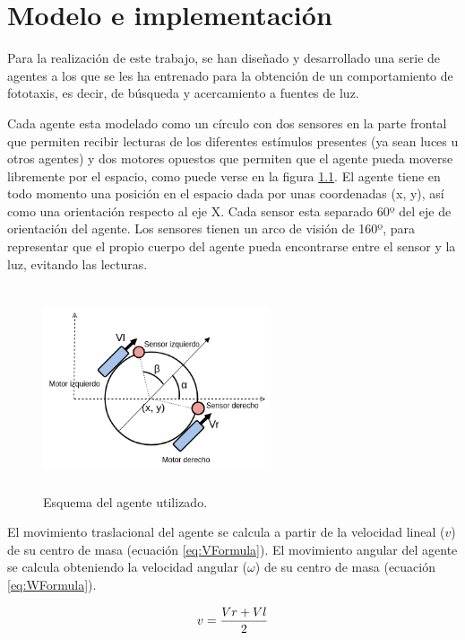 \chapter{Modelo e implementación}
Para la realización de este trabajo, se han diseñado y desarrollado una serie de agentes a los que se les ha entrenado para la obtención de un comportamiento de fototaxis, es decir, de
búsqueda y acercamiento a fuentes de luz.

Cada agente esta modelado como un círculo con dos sensores en la parte frontal que permiten recibir lecturas de los diferentes estímulos presentes (ya sean luces u otros agentes) y dos motores opuestos
que permiten que el agente pueda moverse libremente por el espacio, como puede verse
en la figura \ref{fig:figuraMyAgent}. El agente tiene en todo momento una posición en el espacio dada por unas coordenadas (x, y), así como una orientación respecto al eje X. Cada sensor esta separado
60º del eje de orientación del agente. Los sensores tienen un arco de visión de 160º, para representar que el propio cuerpo del agente pueda encontrarse entre el sensor y la luz, evitando las lecturas.

\begin{figure}[H]
	\centering
	\includegraphics[width=0.6\textwidth,height=6cm]{Imagenes/Agent}
	\caption{Esquema del agente utilizado.}
	\label{fig:figuraMyAgent}
\end{figure}

El movimiento traslacional del agente se calcula a partir de la velocidad lineal ($v$) de su centro de masa (ecuación \ref{eq:VFormula}). El movimiento angular del agente se calcula obteniendo
la velocidad angular ($\omega$) de su centro de masa (ecuación \ref{eq:WFormula}).

\begin{equation} \label{eq:VFormula}
 \centering
 v = \frac{Vr + Vl}{2}
\end{equation}

